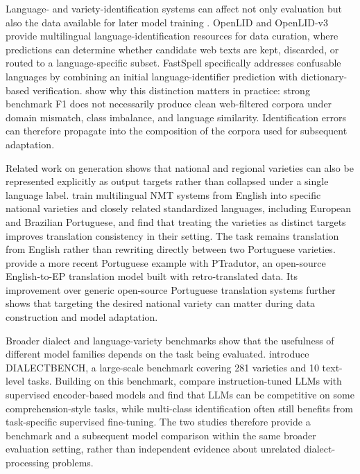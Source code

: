 Language- and variety-identification systems can affect not only evaluation but
also the data available for later model training \citep{zampieri2020natural}.
OpenLID \citep{burchell-etal-2023-openlid} and OpenLID-v3
\citep{fedorova-etal-2026-openlidv3} provide multilingual
language-identification resources for data curation, where predictions can
determine whether candidate web texts are kept, discarded, or routed to a
language-specific subset. FastSpell \citep{banon-etal-2024-fastspell}
specifically addresses confusable languages by combining an initial
language-identifier prediction with dictionary-based verification.
\citet{caswell-etal-2020-language-id-wild} show why this distinction matters in
practice: strong benchmark F1 does not necessarily produce clean web-filtered
corpora under domain mismatch, class imbalance, and language similarity.
Identification errors can therefore propagate into the composition of the
corpora used for subsequent adaptation.

Related work on generation shows that national and regional varieties can also
be represented explicitly as output targets rather than collapsed under a
single language label. \citet{lakew-etal-2018-neural} train multilingual NMT
systems from English into specific national varieties and closely related
standardized languages, including European and Brazilian Portuguese, and find
that treating the varieties as distinct targets improves translation
consistency in their setting. The task remains translation from English rather
than rewriting directly between two Portuguese varieties.
\citet{sousa2025tradutorbuildingvarietyspecific} provide a more recent
Portuguese example with PTradutor, an open-source English-to-EP translation
model built with retro-translated data. Its improvement over generic
open-source Portuguese translation systems further shows that targeting the
desired national variety can matter during data construction and model
adaptation.

Broader dialect and language-variety benchmarks show that the usefulness of
different model families depends on the task being evaluated.
\citet{faisal-etal-2024-dialectbench} introduce DIALECTBENCH, a large-scale
benchmark covering 281 varieties and 10 text-level tasks. Building on this
benchmark, \citet{faisal-anastasopoulos-2025-testing} compare instruction-tuned
LLMs with supervised encoder-based models and find that LLMs can be competitive
on some comprehension-style tasks, while multi-class identification often still
benefits from task-specific supervised fine-tuning. The two studies therefore
provide a benchmark and a subsequent model comparison within the same broader
evaluation setting, rather than independent evidence about unrelated
dialect-processing problems.


